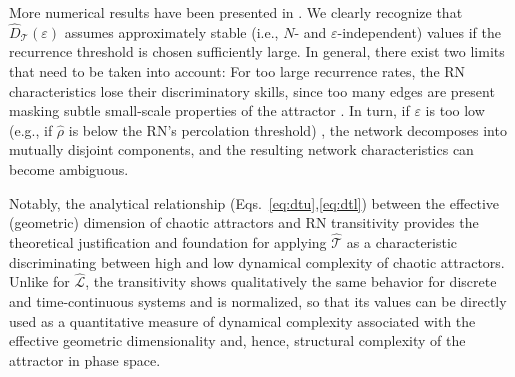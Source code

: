 		More numerical results have been presented in \cite{Donges2012}. We clearly recognize that $\hat{D}_{\mathcal{T}}(\varepsilon)$ assumes approximately stable (i.e., $N$- and $\varepsilon$-independent) values if the recurrence threshold is chosen sufficiently large. In general, there exist two limits that need to be taken into account: For too large recurrence rates, the RN characteristics lose their discriminatory skills, since too many edges are present masking subtle small-scale properties of the attractor \cite{Donges2012,Donner2010b}. In turn, if $\varepsilon$ is too low (e.g., if $\hat{\rho}$ is below the RN's percolation threshold) \cite{Donges2012}, the network decomposes into mutually disjoint components, and the resulting network characteristics can become ambiguous. %

		Notably, the analytical relationship (Eqs.~\ref{eq:dtu},\ref{eq:dtl}) between the effective (geometric) dimension of chaotic attractors and RN transitivity provides the theoretical justification and foundation for applying $\hat{\mathcal{T}}$ as a characteristic discriminating between high and low dynamical complexity of chaotic attractors. Unlike for $\hat{\mathcal{L}}$, the transitivity shows qualitatively the same behavior for discrete and time-continuous systems and is normalized, so that its values can be directly used as a quantitative measure of dynamical complexity associated with the effective geometric dimensionality and, hence, structural complexity of the attractor in phase space.


        
